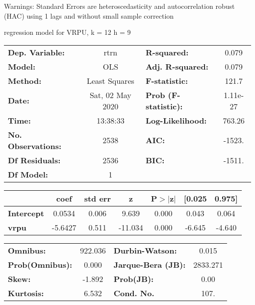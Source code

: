 Warnings: \newline
 [1] Standard Errors are heteroscedasticity and autocorrelation robust (HAC) using 1 lags and without small sample correction\ 

regression model for VRPU, k = 12 h = 9\begin{center}
\begin{tabular}{lclc}
\toprule
\textbf{Dep. Variable:}    &       rtrn       & \textbf{  R-squared:         } &     0.079   \\
\textbf{Model:}            &       OLS        & \textbf{  Adj. R-squared:    } &     0.079   \\
\textbf{Method:}           &  Least Squares   & \textbf{  F-statistic:       } &     121.7   \\
\textbf{Date:}             & Sat, 02 May 2020 & \textbf{  Prob (F-statistic):} &  1.11e-27   \\
\textbf{Time:}             &     13:38:33     & \textbf{  Log-Likelihood:    } &    763.26   \\
\textbf{No. Observations:} &        2538      & \textbf{  AIC:               } &    -1523.   \\
\textbf{Df Residuals:}     &        2536      & \textbf{  BIC:               } &    -1511.   \\
\textbf{Df Model:}         &           1      & \textbf{                     } &             \\
\bottomrule
\end{tabular}
\begin{tabular}{lcccccc}
                   & \textbf{coef} & \textbf{std err} & \textbf{z} & \textbf{P$> |$z$|$} & \textbf{[0.025} & \textbf{0.975]}  \\
\midrule
\textbf{Intercept} &       0.0534  &        0.006     &     9.639  &         0.000        &        0.043    &        0.064     \\
\textbf{vrpu}      &      -5.6427  &        0.511     &   -11.034  &         0.000        &       -6.645    &       -4.640     \\
\bottomrule
\end{tabular}
\begin{tabular}{lclc}
\textbf{Omnibus:}       & 922.036 & \textbf{  Durbin-Watson:     } &    0.015  \\
\textbf{Prob(Omnibus):} &   0.000 & \textbf{  Jarque-Bera (JB):  } & 2833.271  \\
\textbf{Skew:}          &  -1.892 & \textbf{  Prob(JB):          } &     0.00  \\
\textbf{Kurtosis:}      &   6.532 & \textbf{  Cond. No.          } &     107.  \\
\bottomrule
\end{tabular}
\end{center}

